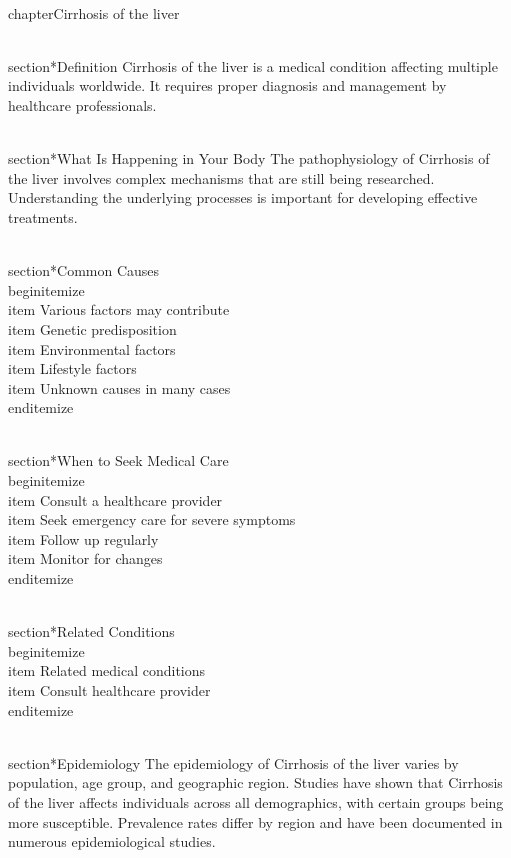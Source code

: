 
\\chapter{Cirrhosis of the liver}

\\section*{Definition}
Cirrhosis of the liver is a medical condition affecting multiple individuals worldwide. It requires proper diagnosis and management by healthcare professionals.

\\section*{What Is Happening in Your Body}
The pathophysiology of Cirrhosis of the liver involves complex mechanisms that are still being researched. Understanding the underlying processes is important for developing effective treatments.

\\section*{Common Causes}
\\begin{itemize}
\\item Various factors may contribute\n  \\item Genetic predisposition\n  \\item Environmental factors\n  \\item Lifestyle factors\n  \\item Unknown causes in many cases
\\end{itemize}

\\section*{When to Seek Medical Care}
\\begin{itemize}
\\item Consult a healthcare provider\n  \\item Seek emergency care for severe symptoms\n  \\item Follow up regularly\n  \\item Monitor for changes
\\end{itemize}

\\section*{Related Conditions}
\\begin{itemize}
\\item Related medical conditions\n  \\item Consult healthcare provider
\\end{itemize}

\\section*{Epidemiology}
The epidemiology of Cirrhosis of the liver varies by population, age group, and geographic region. Studies have shown that Cirrhosis of the liver affects individuals across all demographics, with certain groups being more susceptible. Prevalence rates differ by region and have been documented in numerous epidemiological studies.

